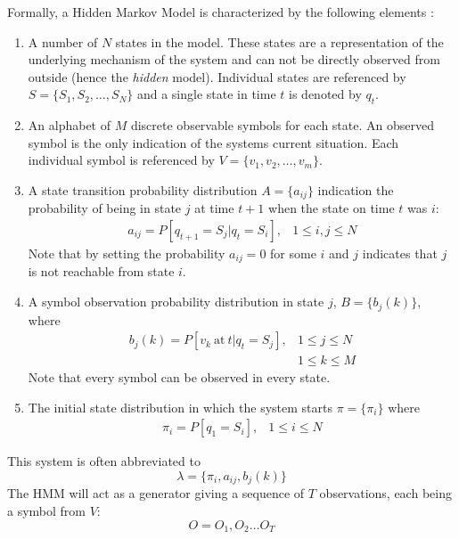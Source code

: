 Formally, a Hidden Markov Model is characterized by the following elements 
\cite{rabiner1989tutorial}:
\begin{enumerate}
	\item A number of $N$ states in the model. These states are a 
	representation of the underlying mechanism of the system and can not be 
	directly observed from outside (hence the \emph{hidden} model). Individual 
	states are referenced by $S = \{S_1, S_2, \dots, S_N \}$ and a single 
	state in time $t$ is denoted by $q_t$.
	\item An alphabet of $M$ discrete observable symbols for each state. An 
	observed symbol is the only indication of the systems current situation. 
	Each individual symbol is referenced by $V = \{ v_1, v_2, \dots, v_m \}$.
	\item A state transition probability distribution $A = \{ a_{ij} \}$ 
	indication the probability of being in state $j$ at time $t+1$ when the 
	state on time $t$ was $i$:
	\begin{eqnarray}
		a_{ij} = P [ q_{t+1} = S_j | q_t = S_i ], & 1 \le i, j \le N
	\end{eqnarray}
	Note that by setting the probability $a_{ij}=0$ for some $i$ and $j$ 
	indicates that $j$ is not reachable from state $i$.
	\item A symbol observation probability distribution in state $j$, $B = \{ 
	b_j(k) \}$, where
	\begin{eqnarray}
	b_j(k) = P[ v_k\ \mathrm{at} \ t | q_t = S_j], & 1 \le j \le N \nonumber \\
	& 1 \le k \le M
	\end{eqnarray}
	Note that every symbol can be observed in every state.
	\item The initial state distribution in which the system starts $\pi= \{ 
	\pi_i \}$ where
	\begin{eqnarray}
	\pi_i = P[q_1 = S_i], & 1 \le i \le N
	\end{eqnarray}
\end{enumerate}
This system is often abbreviated to
\begin{equation}
	\lambda = \{ \pi_i, a_{ij}, b_j(k)\}
\end{equation}
The HMM will act as a generator giving a sequence of $T$ observations, each 
being a symbol from $V$:
\begin{equation}
O = O_1, O_2 \dots O_T
\end{equation}

